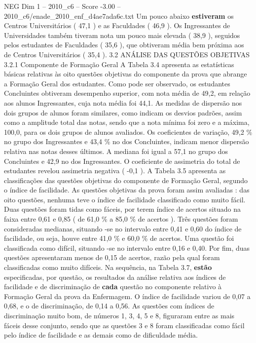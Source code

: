 \begin{textsample}{NEG Dim 1 – 2010\_c6 – Score -3.00 – 2010\_c6/enade\_2010\_enf\_d4ae7ada6c.txt}
Um pouco abaixo \textbf{estiveram} os Centros Universitários ( 47,1 ) e as Faculdades ( 46,9 ).
Os Ingressantes de Universidades também tiveram nota um pouco mais elevada ( 38,9 ), seguidos pelos estudantes de Faculdades ( 35,6 ), que obtiveram média bem próxima aos de Centros Universitários ( 35,4 ). 3.2 ANÁLISE DAS QUESTÕES OBJETIVAS 3.2.1 Componente de Formação Geral A Tabela 3.4 apresenta as estatísticas básicas relativas às oito questões objetivas do componente da prova que abrange a Formação Geral dos estudantes.
Como pode ser observado, os estudantes Concluintes obtiveram desempenho superior, com nota média de 49,2, em relação aos alunos Ingressantes, cuja nota média foi 44,1.
As medidas de dispersão nos dois grupos de alunos foram similares, como indicam os desvios padrões, assim como a amplitude total das notas, sendo que a nota mínima foi zero e a máxima, 100,0, para os dois grupos de alunos avaliados.
Os coeficientes de variação, 49,2 \% no grupo dos Ingressantes e 43,4 \% no dos Concluintes, indicam menor dispersão relativa nas notas desses últimos.
A mediana foi igual a 57,1 no grupo dos Concluintes e 42,9 no dos Ingressantes.
O coeficiente de assimetria do total de estudantes revelou assimetria negativa ( -0,1 ).
A Tabela 3.5 apresenta as classificações das questões objetivas do componente de Formação Geral, segundo o índice de facilidade.
As questões objetivas da prova foram assim avaliadas : das oito questões, nenhuma teve o índice de facilidade classificado como muito fácil.
Duas questões foram tidas como fáceis, por terem índice de acertos situado na faixa entre 0,61 e 0,85 ( de 61,0 \% a 85,0 \% de acertos ).
Três questões foram consideradas medianas, situando -se no intervalo entre 0,41 e 0,60 do índice de facilidade, ou seja, houve entre 41,0 \% e 60,0 \% de acertos.
Uma questão foi classificada como difícil, situando -se no intervalo entre 0,16 e 0,40.
Por fim, duas questões apresentaram menos de 0,15 de acertos, razão pela qual foram classificadas como muito difíceis.
Na sequência, na Tabela 3.7, \textbf{estão} especificadas, por questão, os resultados da análise relativa aos índices de facilidade e de discriminação de \textbf{cada} questão no componente relativo à Formação Geral da prova da Enfermagem.
O índice de facilidade variou de 0,07 a 0,68, e o de discriminação, de 0,14 a 0,56.
As questões com índices de discriminação muito bom, de números 1, 3, 4, 5 e 8, figuraram entre as mais fáceis desse conjunto, sendo que as questões 3 e 8 foram classificadas como fácil pelo índice de facilidade e as demais como de dificuldade média.

\end{textsample}
